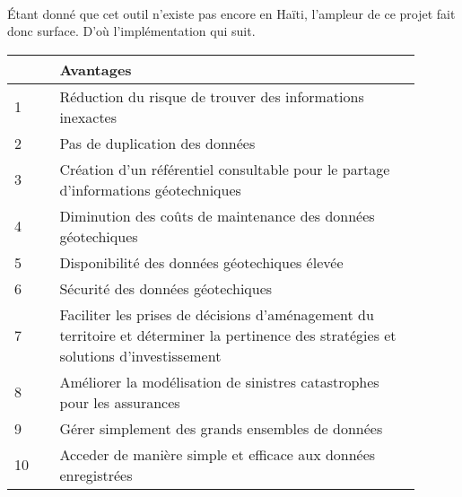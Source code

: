 \paragraph{}
Étant donné que cet outil n'existe pas encore
en Haïti, l'ampleur de ce projet fait donc surface.
D'où l'implémentation qui suit.


\par    
\begin{table}
        \centering
        \begin{tabular}{|p{0.10\linewidth}|p{0.80\linewidth}|}
        \hline
                \textbf{ } & \textbf{Avantages} \\
                \hline
                    1 &
                    Réduction du risque de trouver des informations inexactes
                    \\
                \hline 
                    2 &
                    Pas de duplication des données
                    \\
                \hline 
                    3 &
                    Création d'un référentiel consultable pour le partage d’informations géotechniques
                    \\
                \hline 
                    4 &
                    Diminution des coûts de maintenance des données géotechiques
                    \\
                \hline 
                    5 &
                    Disponibilité des données géotechiques élevée
                    \\
                \hline 
                    6 &
                    Sécurité des données géotechiques
                    \\
                \hline 
                    7 &
                    Faciliter les prises de décisions d’aménagement du territoire 
                    et déterminer la pertinence des stratégies et solutions d’investissement
                    \\
                \hline 
                    8 &
                    Améliorer la modélisation de sinistres catastrophes pour les assurances
                    \\
                \hline 
                    9 &
                    Gérer simplement des grands ensembles de données
                    \\
                \hline 
                    10 &
                    Acceder de manière simple et efficace aux données enregistrées
                    \\

\end{tabular}
\end{table}
